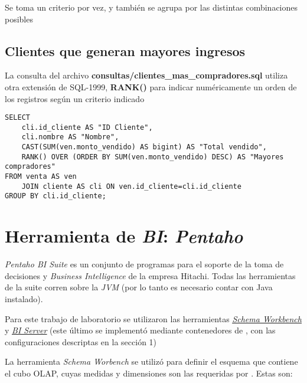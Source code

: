 Se toma un criterio por vez, y también se agrupa por las distintas combinaciones posibles



\subsection{Clientes que generan mayores ingresos}

La consulta del archivo \textbf{consultas/clientes\_mas\_compradores.sql} utiliza otra extensión de SQL-1999, \textbf{RANK()} para indicar numéricamente un orden de los registros según un criterio indicado  

\vspace*{5mm}
\begin{lstlisting}[title=Clientes que generan mayores ingresos para la empresa]
SELECT 
    cli.id_cliente AS "ID Cliente", 
    cli.nombre AS "Nombre", 
    CAST(SUM(ven.monto_vendido) AS bigint) AS "Total vendido", 
    RANK() OVER (ORDER BY SUM(ven.monto_vendido) DESC) AS "Mayores compradores" 
FROM venta AS ven 
    JOIN cliente AS cli ON ven.id_cliente=cli.id_cliente 
GROUP BY cli.id_cliente;
\end{lstlisting}




\section{Herramienta de \emph{BI}: \emph{Pentaho}}

\emph{Pentaho BI Suite} es un conjunto de programas para el soporte de la toma de decisiones y \emph{Business Intelligence} \autocite{wikipedia-pentaho} de la empresa Hitachi. Todas las herramientas de la suite corren sobre la \emph{JVM} (por lo tanto es necesario contar con Java instalado).

Para este trabajo de laboratorio se utilizaron las herramientas \underline{\href{https://mondrian.pentaho.com/documentation/workbench.php}{\emph{Schema Workbench}}} y \underline{\href{https://help.pentaho.com/Documentation/7.1/Installation}{\emph{BI Server}}} (este último se implementó mediante contenedores de \docker{}, con las configuraciones descriptas en la sección 1)

La herramienta \emph{Schema Worbench} se utilizó para definir el esquema que contiene el cubo OLAP, cuyas medidas y dimensiones son las requeridas por . Estas son:

